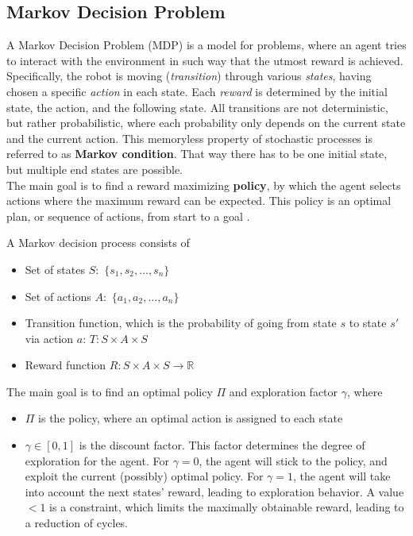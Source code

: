 \documentclass[a4paper]{article}
\begin{document}
	\subsection{Markov Decision Problem}
	A Markov Decision Problem (MDP) is a model for problems, where an agent tries to interact with the environment in such way that the utmost reward is achieved. Specifically, the robot is moving (\textit{transition}) through various \textit{states}, having chosen a specific \textit{action} in each state. Each \textit{reward} is determined by the initial state, the action, and the following state. 
	All transitions are not deterministic, but rather probabilistic, where each probability only depends on the current state and the current action. This memoryless property of stochastic processes is referred to as \textbf{Markov condition}. That way there has to be one initial state, but multiple end states are possible.\\
	\newpage The main goal is to find a reward maximizing \textbf{policy}, by which the agent selects actions where the maximum reward can be expected. This policy is an optimal plan, or sequence of actions, from start to a goal \citep{Lecture}.
	\par A Markov decision process consists of
	\begin{itemize}
		\item Set of states $S:$ $\{s_1,s_2,\dots, s_n\}$
		\item Set of actions $A:$  $\{a_1,a_2,\dots, a_n\}$ 
		\item Transition function, which is the probability of going from state $s$ to state $s'$ via action $a$: $T: S\times A \times S$
		\item  Reward function $R: S\times A \times S \rightarrow \mathbb{R}$
	\end{itemize}
	The main goal is to find an optimal policy $\Pi$ and exploration factor $\gamma$, where
	\begin{itemize}
		\item $\Pi$ is the policy, where an optimal action is assigned to each state
		\item $\gamma \in [0,1]$ is the discount factor. This factor determines the degree of exploration for the agent. For $\gamma=0$, the agent will stick to the policy, and exploit the current (possibly) optimal policy. For $\gamma=1$, the agent will take into account the next states' reward, leading to exploration behavior. A value $<1$ is a constraint, which limits the maximally obtainable reward, leading to a reduction of cycles.
	\end{itemize}
\end{document}
